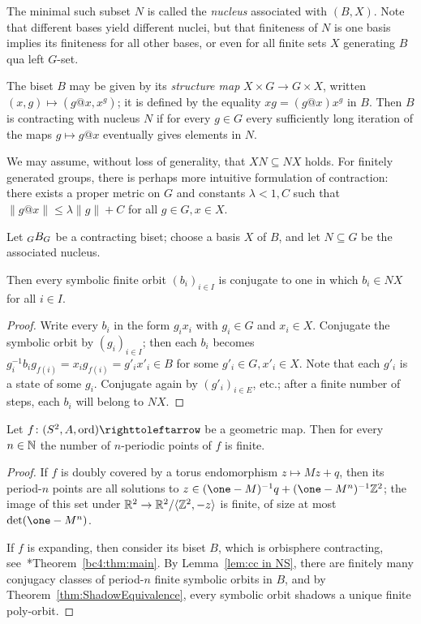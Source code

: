 \documentclass{amsart}
\begin{document}
The minimal such subset $N$ is called the \emph{nucleus} associated
with $(B,X)$. Note that different bases yield different nuclei, but
that finiteness of $N$ is one basis implies its finiteness for all
other bases, or even for all finite sets $X$ generating $B$ qua left
$G$-set.

The biset $B$ may be given by its \emph{structure map}
$X\times G\to G\times X$, written $(x,g)\mapsto(g@x, x^g)$; it is
defined by the equality $x g=(g@x)x^g$ in $B$. Then $B$ is contracting
with nucleus $N$ if for every $g\in G$ every sufficiently long
iteration of the maps $g\mapsto g@x$ eventually gives elements in $N$.

We may assume, without loss of generality, that $X N\subseteq N X$
holds. For finitely generated groups, there is perhaps more intuitive
formulation of contraction: there exists a proper metric on $G$ and
constants $\lambda<1,C$ such that $\|g@x\|\le\lambda\|g\|+C$ for all
$g\in G,x\in X$.
\begin{lem}\label{lem:cc in NS}
  Let $\subscript G B_G$ be a contracting biset; choose a basis $X$ of
  $B$, and let $N\subseteq G$ be the associated nucleus.

  Then every symbolic finite orbit $(b_i)_{i\in I}$ is conjugate to
  one in which $b_i\in N X$ for all $i\in I$.
\end{lem}
\begin{proof}
  Write every $b_i$ in the form $g_i x_i$ with $g_i\in G$ and
  $x_i\in X$. Conjugate the symbolic orbit by $(g_i)_{i\in I}$; then
  each $b_i$ becomes
  $g_i^{-1} b_i g_{f(i)}=x_i g_{f(i)}=g'_i x'_i\in B$ for some
  $g'_i\in G,x'_i\in X$. Note that each $g'_i$ is a state of some
  $g_i$. Conjugate again by $(g'_i)_{i\in E}$, etc.; after a finite
  number of steps, each $b_i$ will belong to $N X$.
\end{proof}

\begin{lem}\label{lem:finiteperiod}
  Let $f\colon(S^2,A,\ord)\selfmap$ be a geometric map. Then for every
  $n\in{\mathbb N}$ the number of $n$-periodic points of $f$ is finite.
\end{lem}
\begin{proof}
  If $f$ is doubly covered by a torus endomorphism $z\mapsto M z+q$,
  then its period-$n$ points are all solutions to
  $z\in(\one-M)^{-1}q+(\one-M^n)^{-1}\Z^2$; the image of this set
  under ${\mathbb R}^2\to{\mathbb R}^2/\langle{\mathbb Z}^2,-z\rangle$ is finite, of size at most
  $\det(\one-M^n)$.

  If $f$ is expanding, then consider its biset $B$, which is
  orbisphere contracting,
  see~\cite{bartholdi-dudko:bc4}*{Theorem~\ref{bc4:thm:main}}. By
  Lemma~\ref{lem:cc in NS}, there are finitely many conjugacy classes
  of period-$n$ finite symbolic orbits in $B$, and by
  Theorem~\ref{thm:ShadowEquivalence}, every symbolic orbit shadows a
  unique finite poly-orbit.
\end{proof}
\end{document}
